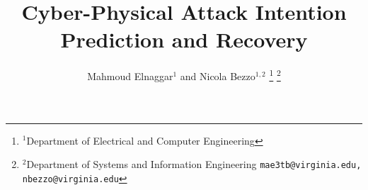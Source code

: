\documentclass[letterpaper, 10 pt, conference]{ieeeconf}  %
\newcommand*{\affmark}[1][*]{\textsuperscript{#1}}
\begin{document}
\title{Cyber-Physical Attack Intention Prediction and Recovery}




\author{Mahmoud Elnaggar$^{1}$ and Nicola Bezzo$^{1,2}$%
\thanks{$^{1}$Department of Electrical and Computer Engineering}
\thanks{$^{2}$Department of Systems and Information Engineering
        {\tt\small  mae3tb@virginia.edu, nbezzo@virginia.edu}}%
}


\maketitle


\begin{abstract}


\end{abstract}


\end{document}
